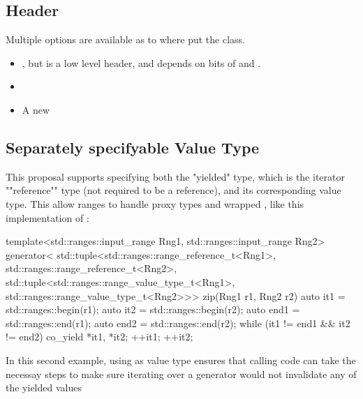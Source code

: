 \documentclass{wg21}
\begin{document}
\subsection{Header}

Multiple options are available as to where put the  class.

\begin{itemize}
    \item {}, but  is a low level header, and  depends on bits of  and .
    
    \item {}
    
    \item A new 
    
\end{itemize}

\subsection{Separately specifyable Value Type}

This proposal supports specifying both the "yielded" type, which is the iterator ""reference"" type (not required to be a reference), and its corresponding value type.
This allow ranges to handle proxy types and wrapped , like this implementation of :

\begin{colorblock}
    template<std::ranges::input_range Rng1,
    std::ranges::input_range Rng2>
    generator<
    std::tuple<std::ranges::range_reference_t<Rng1>,
    std::ranges::range_reference_t<Rng2>,
    std::tuple<std::ranges::range_value_type_t<Rng1>,
    std::ranges::range_value_type_t<Rng2>>>
    zip(Rng1 r1, Rng2 r2) {
        auto it1 = std::ranges::begin(r1);
        auto it2 = std::ranges::begin(r2);
        auto end1 = std::ranges::end(r1);
        auto end2 = std::ranges::end(r2);
        while (it1 != end1 && it2 != end2) {
            co_yield {*it1, *it2};
            ++it1; ++it2;
        }
    }
\end{colorblock}

In this second example, using  as value type ensures that calling code can take the necessay steps
to make sure iterating over a generator would not invalidate any of the yielded values
\end{document}
